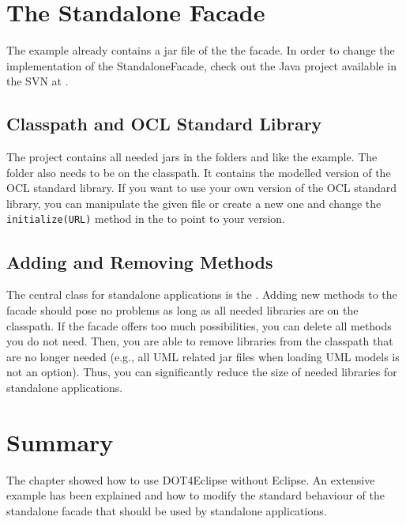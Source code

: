 \section{The Standalone Facade}

The example already contains a jar file of the the facade. In order to change the implementation of the StandaloneFacade, check out the Java project available in the SVN  at .

\subsection{Classpath and OCL Standard Library}
The project contains all needed jars in the folders  and  like the example. The  folder also needs to be on the classpath. It contains the modelled version of the OCL standard library. If you want to use your own version of the OCL standard library, you can manipulate the given file or create a new one and change the \lstinline[breaklines=true]{initialize(URL)} method in the  to point to your version.

\subsection{Adding and Removing Methods}
The central class for standalone applications is the . Adding new methods to the facade should pose no problems as long as all needed libraries are on the classpath. If the facade offers too much possibilities, you can delete all methods you do not need. Then, you are able to remove libraries from the classpath that are no longer needed (e.g., all UML related jar files when loading UML models is not an option). Thus, you can significantly reduce the size of needed libraries for standalone applications.


\section{Summary}

The chapter showed how to use \acl{DOT4Eclipse} without Eclipse. An extensive example has been explained and how to modify the standard behaviour of the standalone facade that should be used by standalone applications.